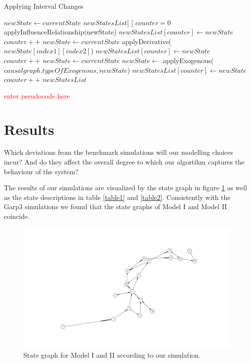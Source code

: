 \documentclass{article}
\begin{document}
\begin{algorithm}
	\caption{Applying Interval Changes}\label{intervalchanges}
	\begin{algorithmic}[1]
		\State $newState \gets currentState$
		\State $newStatesList$[ ]
		\State $counter=0$
		\State applyInfluenceRelationship(newState)
		\EndIf
		\State $newStatesList[counter] \gets newState$
		\State $counter++$
		\EndIf
		\EndFor
		\State $newState \gets currentState$
		\State applyDerivative($newState[index1][index2]$)
		\State $newStatesList[counter] \gets newState$
		\State $counter++$
		\EndIf
		\EndFor
		\EndFor
		\State $newState \gets currentState$
		\State $newState \gets$ applyExogenous($causalgraph.typeOfExogenous,newState$)
		\State $newStatesList[counter] \gets newState$
		\State $counter++$
		\EndIf
		\State \Return $newStatesList$
		\EndProcedure
	\end{algorithmic}
\end{algorithm}

\textcolor{red}{enter pseudocode here}

\section{Results}

Which deviations from the benchmark simulations will our modelling choices incur? And do they affect the overall degree to which our algortihm captures the behaviour of the system? 

The results of our simulations are visualized by the state graph in figure \ref{figure8} as well as the state descriptions in table \ref{table1} and \ref{table2}. Consistently with the Garp3 simulations we found that the state graphs of Model I and Model II coincide.

\begin{figure}
	\includegraphics[scale=0.3]{Ok_State_Graph.png}
	\caption{State graph for Model I and II according to our simulation. }
	\label{figure8}
\end{figure}
\end{document}
